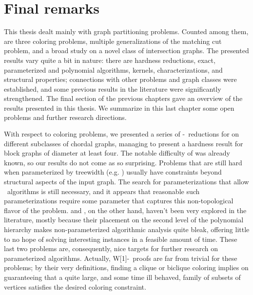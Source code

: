 \chapter{Final remarks}
\label{ch:conclusion}

This thesis dealt mainly with graph partitioning problems.
Counted among them, are three coloring problems, multiple generalizations of the matching cut problem, and a broad study on a novel class of intersection graphs.
The presented results vary quite a bit in nature: there are hardness reductions, exact, parameterized and polynomial algorithms, kernels,  characterizations, and structural properties; connections with other problems and graph classes were established, and some previous results in the literature were significantly strengthened.
The final section of the previous chapters gave an overview of the results presented in this thesis.
We summarize in this last chapter some open problems and further research directions.

With respect to coloring problems, we presented a series of \W[1]-\Hness\ reductions for  on different subclasses of chordal graphs, managing to present a hardness result for block graphs of diameter at least four.
The notable difficulty of  was already known, so our results do not come as so surprising.
Problems that are still hard when parameterized by treewidth (e.g. ) usually have constraints beyond structural aspects of the input graph.
The search for parameterizations that allow \FPT\ algorithms is still necessary, and it appears that reasonable such parameterizations require some parameter that captures this non-topological flavor of the problem.
 and , on the other hand, haven't been very explored in the literature, mostly because their placement on the second level of the polynomial hierarchy makes non-parameterized algorithmic analysis quite bleak, offering little to no hope of solving interesting instances in a feasible amount of time.
These last two problems are, consequently, nice targets for further research on parameterized algorithms.
Actually, W[1]-\Hness\ proofs are far from trivial for these problems; by their very definitions, finding a clique or biclique coloring implies on guaranteeing that a quite large, and some time ill behaved, family of subsets of vertices satisfies the desired coloring constraint.

